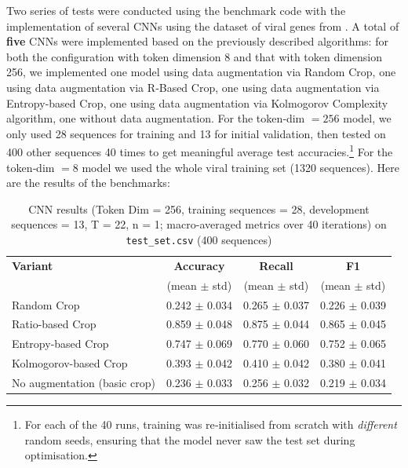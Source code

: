 \documentclass{article}
\theoremstyle{remark}
\begin{document}
Two series of tests were conducted using the benchmark code with the implementation of several CNNs using the dataset of viral genes from \cite{ref14}. A total of \textbf{five} CNNs were implemented based on the previously described algorithms: for both the configuration with token dimension 8 and that with token dimension 256, we implemented one model using data augmentation via Random Crop, one using data augmentation via R‑Based Crop, one using data augmentation via Entropy-based Crop, one using data augmentation via Kolmogorov Complexity algorithm, one without data augmentation. For the token‑dim \(=256\) model, we only used 28 sequences for training and 13 for initial validation, then tested on 400 other sequences 40 times to get meaningful average test accuracies.\footnote{For each of the 40 runs, training was re‑initialised from scratch with \emph{different} random seeds, ensuring that the model never saw the test set during optimisation.} For the token‑dim \(=8\) model we used the whole viral training set (1320 sequences). Here are the results of the benchmarks:

\begin{table}[H]
\centering
\caption{CNN results (Token Dim = 256, training sequences = 28, development sequences = 13, T = 22, n = 1; macro-averaged metrics over 40 iterations) on \texttt{test\_set.csv} (400 sequences)}
\begin{tabular}{l c c c}
\hline
\textbf{Variant}               & \textbf{Accuracy}      & \textbf{Recall}        & \textbf{F1}            \\
                               & (mean $\pm$ std)           & (mean $\pm$ std)           & (mean $\pm$ std)           \\
\hline
Random Crop                    & 0.242 $\pm$ 0.034          & 0.265 $\pm$ 0.037          & 0.226 $\pm$ 0.039          \\
Ratio-based Crop               & 0.859 $\pm$ 0.048          & 0.875 $\pm$ 0.044          & 0.865 $\pm$ 0.045          \\
Entropy-based Crop             & 0.747 $\pm$ 0.069          & 0.770 $\pm$ 0.060          & 0.752 $\pm$ 0.065          \\
Kolmogorov-based Crop          & 0.393 $\pm$ 0.042          & 0.410 $\pm$ 0.042          & 0.380 $\pm$ 0.041          \\
No augmentation (basic crop)   & 0.236 $\pm$ 0.033          & 0.256 $\pm$ 0.032          & 0.219 $\pm$ 0.034          \\
\hline
\end{tabular}
\end{table}
\end{document}
